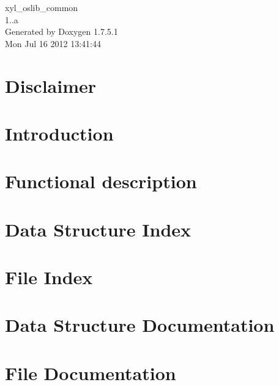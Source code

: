\documentclass[a4paper]{book}
\begin{document}
\hypersetup{pageanchor=false,citecolor=blue}
\begin{titlepage}
\vspace*{7cm}
\begin{center}
{\Large xyl\-\_\-oslib\-\_\-common \\[1ex]\large 1..\-a }\\
\vspace*{1cm}
{\large \-Generated by Doxygen 1.7.5.1}\\
\vspace*{0.5cm}
{\small Mon Jul 16 2012 13:41:44}\\
\end{center}
\end{titlepage}
\clearemptydoublepage
{}
\tableofcontents
\clearemptydoublepage
{}
\hypersetup{pageanchor=true,citecolor=blue}
\chapter{\-Disclaimer}
\label{p1}
\hypertarget{p1}{}

\chapter{\-Introduction}
\label{p2}
\hypertarget{p2}{}

\chapter{\-Functional description}
\label{p3}
\hypertarget{p3}{}

\chapter{\-Data \-Structure \-Index}

\chapter{\-File \-Index}

\chapter{\-Data \-Structure \-Documentation}



\chapter{\-File \-Documentation}













\printindex
\end{document}
